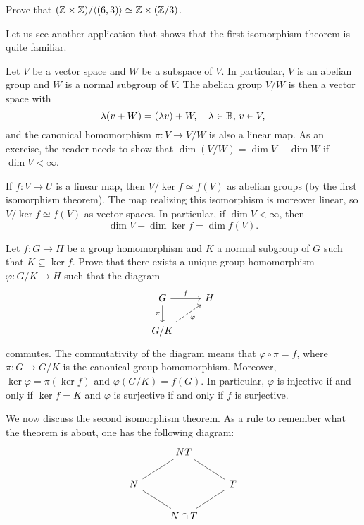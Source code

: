 
\begin{exercise}
Prove that 
$(\mathbb{Z}\times\mathbb{Z})/\langle (6,3)\rangle\simeq\mathbb{Z}\times(\mathbb{Z}/3)$.
\end{exercise}

Let us see another application that shows that
the first isomorphism theorem is quite familiar. 

\begin{example}
Let $V$ be a vector space and $W$ be a subspace of $V$. 
In particular, 
$V$ is an abelian group and 
$W$ is a normal subgroup of $V$. The abelian group 
$V/W$ is then a vector space with 
\[
\lambda(v+W)=(\lambda v)+W,\quad \lambda\in\mathbb{R},\,v\in V,
\]
and the canonical homomorphism
$\pi\colon V\to V/W$ is also a linear map. As an exercise, 
the reader needs to show that 
$\dim (V/W)=\dim V-\dim W$
if $\dim V<\infty$.

If $f\colon V\to U$ is a linear map, then
$V/\ker f\simeq f(V)$ as abelian groups (by the first
isomorphism theorem). The map realizing this
isomorphism is moreover linear, so 
$V/\ker f\simeq f(V)$ as vector spaces. In particular, 
if $\dim V<\infty$, then
\[
\dim V-\dim\ker f=\dim f(V).
\]
\end{example}

\begin{exercise}
\label{xca:quotients}
Let $f\colon G\to H$ be a group homomorphism and 
$K$ a normal subgroup of $G$ such that $K\subseteq\ker f$. 
Prove that there exists a unique group homomorphism 
$\varphi\colon G/K\to H$ such that the diagram 
\[\begin{tikzcd}
        G & H \\
        {G/K}
        \arrow["f", from=1-1, to=1-2]
        \arrow["\pi"', from=1-1, to=2-1]
        \arrow["\varphi"', dashed, from=2-1, to=1-2]
\end{tikzcd}
\]
commutes. The commutativity of the diagram means that  $\varphi\circ\pi=f$, where $\pi\colon G\to G/K$ is the canonical group
homomorphism. Moreover, 
$\ker\varphi=\pi(\ker f)$ and $\varphi(G/K)=f(G)$.
In particular, $\varphi$ is injective if and only if 
$\ker f=K$ and $\varphi$ is surjective if and only if $f$ is surjective. 
\end{exercise}

We now discuss the second isomorphism theorem. As a rule to remember
what the theorem is about, one has the following diagram:
\[\begin{tikzcd}
        & NT \\
        N && T \\
        & {N\cap T}
        \arrow[no head, from=1-2, to=2-3]
        \arrow[no head, from=1-2, to=2-1]
        \arrow[no head, from=2-1, to=3-2]
        \arrow[no head, from=2-3, to=3-2]
\end{tikzcd}\]

